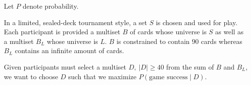 \documentclass[12pt, letterpaper]{article}
\begin{document}
Let $ P $ denote probability.

In a limited, sealed-deck tournament style, a set $ S $ is chosen and used for play.
Each participant is provided a multiset $ B $ of cards whose universe is $ S $
as well as a multiset $ B_L $ whose universe is $ L $.
$ B $ is constrained to contain $ 90 $ cards
whereas $ B_L $ contains an infinite amount of cards.

Given participants must select a multiset $ D, \ |D| \ge 40 $ from the sum of $ B $ and $ B_L $,
we want to choose $ D $ such that we maximize $ P(\text{game success} \mid D) $.
\end{document}
